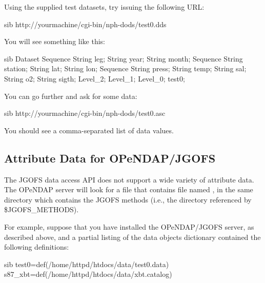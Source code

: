 \documentclass{dods-book}
\begin{document}
Using the supplied test datasets, try issuing the following URL:

\begin{vcode}{sib}
http://yourmachine/cgi-bin/nph-dods/test0.dds
\end{vcode}

You will see something like this:

\begin{vcode}{sib}
Dataset {
    Sequence {
        String leg;
        String year;
        String month;
        Sequence {
            String station;
            String lat;
            String lon;
            Sequence {
                String press;
                String temp;
                String sal;
                String o2;
                String sigth;
            } Level_2;
        } Level_1;
    } Level_0;
} test0;
\end{vcode}

You can go further and ask for some data:

\begin{vcode}{sib}
http://yourmachine/cgi-bin/nph-dods/test0.asc  
\end{vcode}

You should see a comma-separated list of data values.



\subsection{Attribute Data for OPeNDAP/JGOFS}
\label{jgofs,das}

The JGOFS data access API does not support a wide variety of attribute
data. The OPeNDAP server will  look for a file that contains 
 file named , in the same
directory which contains the JGOFS methods (i.e., the directory
referenced by \$JGOFS_METHODS).


For example, suppose that you have installed the OPeNDAP/JGOFS server, as
described above, and a partial listing of the data objects dictionary
contained the following definitions:

\begin{vcode}{sib}
test0=def(/home/httpd/htdocs/data/test0.data)
s87_xbt=def(/home/httpd/htdocs/data/xbt.catalog)
\end{vcode}
\end{document}
